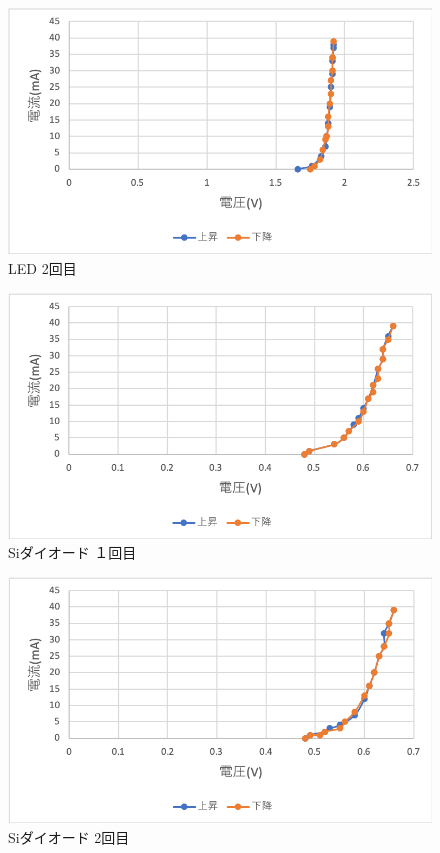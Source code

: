 \documentclass[11pt, a4paper,twocolumn]{jarticle}
\begin{document}
\begin{figure}[htbp]
 \begin{center}
  \includegraphics[width=0.8\linewidth]{fig24.png}
 \end{center}
 \caption{LED 2回目}
 \label{fig:24}
\end{figure}

\begin{figure}[htbp]
 \begin{center}
  \includegraphics[width=0.8\linewidth]{fig25.png}
 \end{center}
 \caption{Siダイオード １回目}
 \label{fig:25}
\end{figure}

\begin{figure}[htbp]
 \begin{center}
  \includegraphics[width=0.8\linewidth]{fig26.png}
 \end{center}
 \caption{Siダイオード 2回目}
 \label{fig:26}
\end{figure}
\end{document}
